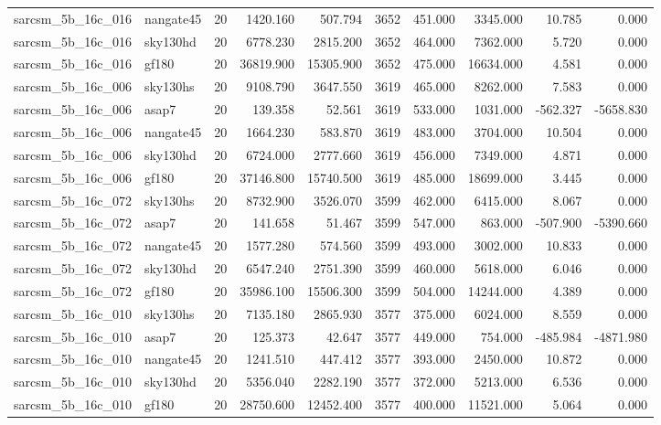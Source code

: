 \begin{longtable}{llrrrrrrrr}
sarcsm\_5b\_16c\_016 & nangate45 & 20 & 1420.160 & 507.794 & 3652 & 451.000 & 3345.000 & 10.785 & 0.000 \\
sarcsm\_5b\_16c\_016 & sky130hd & 20 & 6778.230 & 2815.200 & 3652 & 464.000 & 7362.000 & 5.720 & 0.000 \\
sarcsm\_5b\_16c\_016 & gf180 & 20 & 36819.900 & 15305.900 & 3652 & 475.000 & 16634.000 & 4.581 & 0.000 \\
sarcsm\_5b\_16c\_006 & sky130hs & 20 & 9108.790 & 3647.550 & 3619 & 465.000 & 8262.000 & 7.583 & 0.000 \\
sarcsm\_5b\_16c\_006 & asap7 & 20 & 139.358 & 52.561 & 3619 & 533.000 & 1031.000 & -562.327 & -5658.830 \\
sarcsm\_5b\_16c\_006 & nangate45 & 20 & 1664.230 & 583.870 & 3619 & 483.000 & 3704.000 & 10.504 & 0.000 \\
sarcsm\_5b\_16c\_006 & sky130hd & 20 & 6724.000 & 2777.660 & 3619 & 456.000 & 7349.000 & 4.871 & 0.000 \\
sarcsm\_5b\_16c\_006 & gf180 & 20 & 37146.800 & 15740.500 & 3619 & 485.000 & 18699.000 & 3.445 & 0.000 \\
sarcsm\_5b\_16c\_072 & sky130hs & 20 & 8732.900 & 3526.070 & 3599 & 462.000 & 6415.000 & 8.067 & 0.000 \\
sarcsm\_5b\_16c\_072 & asap7 & 20 & 141.658 & 51.467 & 3599 & 547.000 & 863.000 & -507.900 & -5390.660 \\
sarcsm\_5b\_16c\_072 & nangate45 & 20 & 1577.280 & 574.560 & 3599 & 493.000 & 3002.000 & 10.833 & 0.000 \\
sarcsm\_5b\_16c\_072 & sky130hd & 20 & 6547.240 & 2751.390 & 3599 & 460.000 & 5618.000 & 6.046 & 0.000 \\
sarcsm\_5b\_16c\_072 & gf180 & 20 & 35986.100 & 15506.300 & 3599 & 504.000 & 14244.000 & 4.389 & 0.000 \\
sarcsm\_5b\_16c\_010 & sky130hs & 20 & 7135.180 & 2865.930 & 3577 & 375.000 & 6024.000 & 8.559 & 0.000 \\
sarcsm\_5b\_16c\_010 & asap7 & 20 & 125.373 & 42.647 & 3577 & 449.000 & 754.000 & -485.984 & -4871.980 \\
sarcsm\_5b\_16c\_010 & nangate45 & 20 & 1241.510 & 447.412 & 3577 & 393.000 & 2450.000 & 10.872 & 0.000 \\
sarcsm\_5b\_16c\_010 & sky130hd & 20 & 5356.040 & 2282.190 & 3577 & 372.000 & 5213.000 & 6.536 & 0.000 \\
sarcsm\_5b\_16c\_010 & gf180 & 20 & 28750.600 & 12452.400 & 3577 & 400.000 & 11521.000 & 5.064 & 0.000 \\

\end{longtable}
